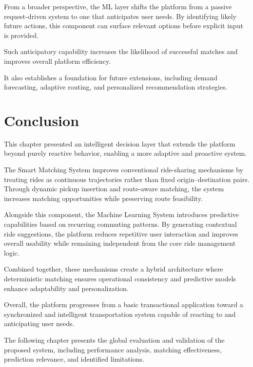 From a broader perspective, the ML layer shifts the platform from a passive request-driven system to one that anticipates user needs. By identifying likely future actions, this component can surface relevant options before explicit input is provided.

Such anticipatory capability increases the likelihood of successful matches and improves overall platform efficiency.

It also establishes a foundation for future extensions, including demand forecasting, adaptive routing, and personalized recommendation strategies.

\vspace{-0.6cm}
\section{Conclusion}

This chapter presented an intelligent decision layer that extends the platform beyond purely reactive behavior, enabling a more adaptive and proactive system.

The Smart Matching System improves conventional ride-sharing mechanisms by treating rides as continuous trajectories rather than fixed origin--destination pairs. Through dynamic pickup insertion and route-aware matching, the system increases matching opportunities while preserving route feasibility.

Alongside this component, the Machine Learning System introduces predictive capabilities based on recurring commuting patterns. By generating contextual ride suggestions, the platform reduces repetitive user interaction and improves overall usability while remaining independent from the core ride management logic.

Combined together, these mechanisms create a hybrid architecture where deterministic matching ensures operational consistency and predictive models enhance adaptability and personalization.

Overall, the platform progresses from a basic transactional application toward a synchronized and intelligent transportation system capable of reacting to and anticipating user needs.

The following chapter presents the global evaluation and validation of the proposed system, including performance analysis, matching effectiveness, prediction relevance, and identified limitations.